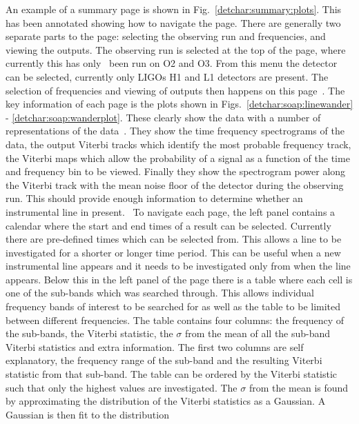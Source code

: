 An example of a summary page is shown in Fig.~\ref{detchar:summary:plots}. This
has been annotated showing how to navigate the page.  There are generally two
separate parts to the page: selecting the observing run and frequencies, and
viewing the outputs.  The observing run is selected at the top of the page,
where currently this has only~ been run on O2 and O3.  From this menu the
detector can be selected, currently only \glspl{LIGO} H1 and L1 detectors are
present. The selection of frequencies and viewing of outputs then happens on
this page~. The key information of each page is the plots shown in
Figs.~\ref{detchar:soap:linewander} - \ref{detchar:soap:wanderplot}.  These
clearly show the data with a number of representations of the data~. They show
the time frequency spectrograms of the data, the output Viterbi tracks which
identify the most probable frequency track, the Viterbi maps which allow the
probability of a signal as a function of the time and frequency bin to be
viewed.  Finally they show the spectrogram power along the Viterbi track with
the mean noise floor of the detector during the observing run.  This should
provide enough information to determine whether an instrumental line in
present.~ To navigate each page, the left panel contains a calendar where the
start and end times of a result can be selected.  Currently there are
pre-defined times which can be selected from. This allows a line to be
investigated for a shorter or longer time period.  This can be useful when a
new instrumental line appears and it needs to be investigated only from when
the line appears.  Below this in the left panel of the page there is a table
where each cell is one of the sub-bands which was searched through. This allows
individual frequency bands of interest to be searched for as well as the table
to be limited between different frequencies.  The table contains four columns:
the frequency of the sub-bands, the Viterbi statistic, the $\sigma$ from the
mean of all the sub-band Viterbi statistics and extra information.  The first
two columns are self explanatory, the frequency range of the sub-band and the
resulting Viterbi statistic from that sub-band. The table can be ordered by the
Viterbi statistic such that only the highest values are investigated.  The
$\sigma$ from the mean is found by approximating the distribution of the
Viterbi statistics as a Gaussian.  A Gaussian is then fit to the distribution
